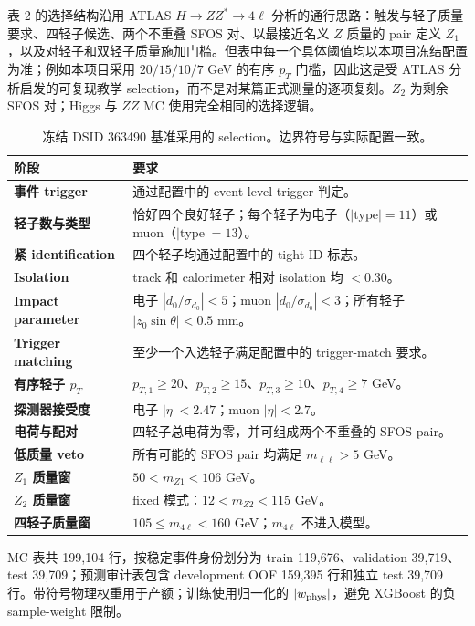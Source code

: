 \documentclass[11pt,a4paper,fontset=none]{ctexart}
\begin{document}
表 2 的选择结构沿用 ATLAS $H\to ZZ^{*}\to4\ell$ 分析的通行思路：触发与轻子质量要求、四轻子候选、两个不重叠 SFOS 对、以最接近名义 $Z$ 质量的 pair 定义 $Z_1$，以及对轻子和双轻子质量施加门槛\cite{atlas-h4l-run1,atlas-open-data-hzz}。但表中每一个具体阈值均以本项目冻结配置为准；例如本项目采用 $20/15/10/7$ GeV 的有序 $p_T$ 门槛，因此这是受 ATLAS 分析启发的可复现教学 selection，而不是对某篇正式测量的逐项复刻。$Z_2$ 为剩余 SFOS 对；Higgs 与 $ZZ$ MC 使用完全相同的选择逻辑。

\begin{table}[H]
\centering
\small
\caption{冻结 DSID 363490 基准采用的 selection。边界符号与实际配置一致。}
\begin{tabularx}{\linewidth}{>{\bfseries}p{2.8cm}X}
\toprule
阶段 & 要求\\
\midrule
事件 trigger & 通过配置中的 event-level trigger 判定。\\
轻子数与类型 & 恰好四个良好轻子；每个轻子为电子（$|\mathrm{type}|=11$）或 muon（$|\mathrm{type}|=13$）。\\
紧 identification & 四个轻子均通过配置中的 tight-ID 标志。\\
Isolation & track 和 calorimeter 相对 isolation 均 $<0.30$。\\
Impact parameter & 电子 $|d_0/\sigma_{d_0}|<5$；muon $|d_0/\sigma_{d_0}|<3$；所有轻子 $|z_0\sin\theta|<0.5$ mm。\\
Trigger matching & 至少一个入选轻子满足配置中的 trigger-match 要求。\\
有序轻子 $p_T$ & $p_{T,1}\geq20$、$p_{T,2}\geq15$、$p_{T,3}\geq10$、$p_{T,4}\geq7$ GeV。\\
探测器接受度 & 电子 $|\eta|<2.47$；muon $|\eta|<2.7$。\\
电荷与配对 & 四轻子总电荷为零，并可组成两个不重叠的 SFOS pair。\\
低质量 veto & 所有可能的 SFOS pair 均满足 $m_{\ell\ell}>5$ GeV。\\
$Z_1$ 质量窗 & $50<m_{Z1}<106$ GeV。\\
$Z_2$ 质量窗 & fixed 模式：$12<m_{Z2}<115$ GeV。\\
四轻子质量窗 & $105\leq m_{4\ell}<160$ GeV；$m_{4\ell}$ 不进入模型。\\
\bottomrule
\end{tabularx}
\end{table}

MC 表共 199,104 行，按稳定事件身份划分为 train 119,676、validation 39,719、test 39,709；预测审计表包含 development OOF 159,395 行和独立 test 39,709 行。带符号物理权重用于产额；训练使用归一化的 $|w_{\rm phys}|$，避免 XGBoost 的负 sample-weight 限制。
\end{document}
